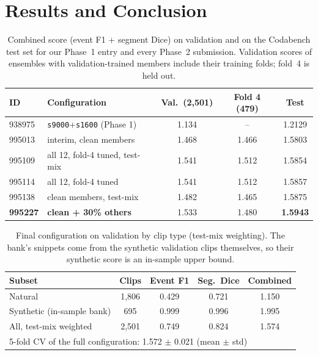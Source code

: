 \documentclass[conference]{IEEEtran}
\begin{document}
\section{Results and Conclusion}
\begin{table}[t]
\centering
\caption{Combined score (event F1 + segment Dice) on validation and on the Codabench test set for our Phase~1
entry and every Phase~2 submission. Validation scores of ensembles with validation-trained members include their
training folds; fold~4 is held out.}
\label{tab:res}
\footnotesize
\setlength{\tabcolsep}{3pt}
\begin{tabular}{llccc}
\toprule
ID & Configuration & Val.\ (2,501) & Fold 4 (479) & Test\\
\midrule
938975 & \texttt{s9000}+\texttt{s1600} (Phase 1) & 1.134 & -- & 1.2129\\
995013 & interim, clean members & 1.468 & 1.466 & 1.5803\\
995109 & all 12, fold-4 tuned, test-mix & 1.541 & 1.512 & 1.5854\\
995114 & all 12, fold-4 tuned & 1.541 & 1.512 & 1.5857\\
995138 & clean members, test-mix & 1.482 & 1.465 & 1.5875\\
\textbf{995227} & \textbf{clean + 30\% others} & 1.533 & 1.480 & \textbf{1.5943}\\
\bottomrule
\end{tabular}
\end{table}

\begin{table}[t]
\centering
\caption{Final configuration on validation by clip type (test-mix weighting). The bank's snippets come from the
synthetic validation clips themselves, so their synthetic score is an in-sample upper bound.}
\label{tab:split}
\footnotesize
\setlength{\tabcolsep}{4pt}
\begin{tabular}{lcccc}
\toprule
Subset & Clips & Event F1 & Seg.\ Dice & Combined\\
\midrule
Natural & 1,806 & 0.429 & 0.721 & 1.150\\
Synthetic (in-sample bank) & 695 & 0.999 & 0.996 & 1.995\\
All, test-mix weighted & 2,501 & 0.749 & 0.824 & 1.574\\
\midrule
\multicolumn{5}{l}{5-fold CV of the full configuration: 1.572 $\pm$ 0.021 (mean $\pm$ std)}\\
\bottomrule
\end{tabular}
\end{table}
\end{document}
